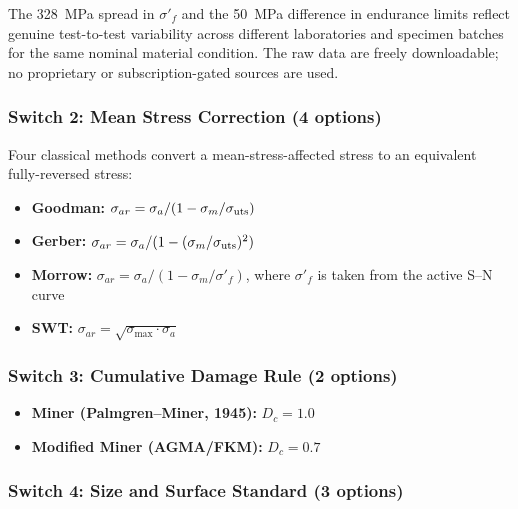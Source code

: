 \documentclass[12pt,a4paper]{article}
\begin{document}
The 328~MPa spread in $\sigma'_f$ and the 50~MPa difference in endurance
limits reflect genuine test-to-test variability across different
laboratories and specimen batches for the same nominal material
condition. The raw data are freely downloadable; no proprietary or
subscription-gated sources are used.

\subsubsection{Switch 2: Mean Stress Correction (4 options)}

Four classical methods convert a mean-stress-affected stress to an
equivalent fully-reversed stress:

\begin{itemize}
  \item \textbf{Goodman:}
        $\sigma_{ar} = \sigma_a / (1 - \sigma_m/\sigma_{\rm uts})$
  \item \textbf{Gerber:}
        $\sigma_{ar} = \sigma_a / (1 - (\sigma_m/\sigma_{\rm uts})^2)$
  \item \textbf{Morrow:}
        $\sigma_{ar} = \sigma_a / (1 - \sigma_m/\sigma'_f)$,
        where $\sigma'_f$ is taken from the active S--N curve
  \item \textbf{SWT:}
        $\sigma_{ar} = \sqrt{\sigma_{\max} \cdot \sigma_a}$
\end{itemize}

\subsubsection{Switch 3: Cumulative Damage Rule (2 options)}

\begin{itemize}
  \item \textbf{Miner (Palmgren--Miner, 1945):} $D_c = 1.0$
  \item \textbf{Modified Miner (AGMA/FKM):} $D_c = 0.7$
\end{itemize}

\subsubsection{Switch 4: Size and Surface Standard (3 options)}
\end{document}
